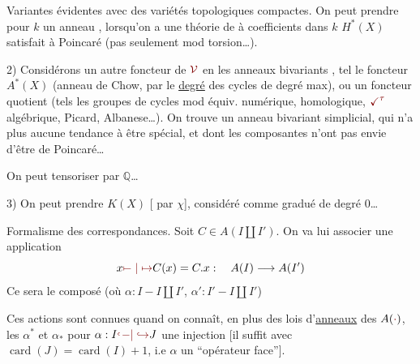 
Variantes évidentes avec des variétés topologiques compactes.
On peut prendre pour $k$ un anneau , lorsqu'on a une théorie de  à coefficients dans $k$    $H^*(X)$ satisfait à Poincaré  (pas seulement mod torsion\ldots).

2) Considérons un autre foncteur de $\unsure{\mathcal{V}}$ en les anneaux bivariants , tel le foncteur $A^*(X)$ (anneau de Chow,   par le \uline{degré} des cycles de degré max), ou un foncteur quotient (tels les groupes de cycles mod équiv. numérique, homologique, $\unsure{\checkmark^{\tau}}$ algébrique, Picard, Albanese\ldots). On trouve un anneau bivariant  simplicial, qui n'a plus aucune tendance à être spécial, et dont les composantes n'ont pas  envie d'être de Poincaré\ldots

On peut tensoriser par $\mathbb{Q}$\ldots

3) On peut prendre $K(X)$ [ par $\chi$], considéré comme gradué de degré 0\ldots

Formalisme des correspondances. Soit $C\in A(I\amalg I')$. On va lui associer une application
\[
x\unsure{\mapstochar\relbar|\mapsto} C(x)=C.x:\quad A(I)\longrightarrow A(I')
\]
Ce sera le composé (où $\alpha:I-I\amalg I'$, $\alpha':I'-I\amalg I'$)

Ces actions sont connues quand on connaît, en plus des lois d'\uline{anneaux} des $A(\unsure{\cdot})$, les $\alpha^*$ et $\alpha_*$ pour $\alpha:I\unsure{\lhook\joinrel-|\hookrightarrow}J$ une injection [il suffit avec $\operatorname{card}(J)=\operatorname{card}(I)+1$, i.e $\alpha$ un ``opérateur face''].
